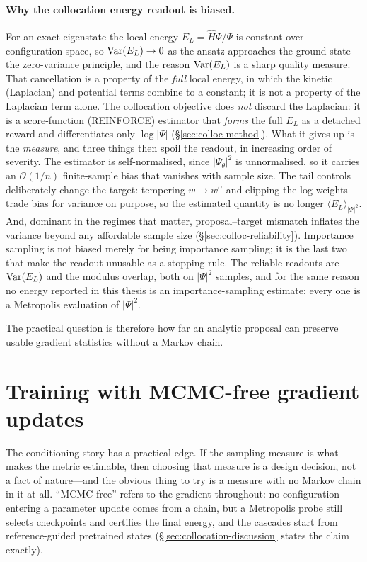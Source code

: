 \paragraph{Why the collocation energy readout is biased.} For an exact eigenstate the
local energy $E_L=\hat H\Psi/\Psi$ is constant over configuration space, so
$\mathrm{Var}(E_L)\to0$ as the ansatz approaches the ground state---the zero-variance principle,
and the reason $\mathrm{Var}(E_L)$ is a sharp quality measure. That cancellation is a property of
the \emph{full} local energy, in which the kinetic (Laplacian) and potential terms combine
to a constant; it is not a property of the Laplacian term alone. The collocation objective
does \emph{not} discard the Laplacian: it is a score-function (REINFORCE) estimator that
\emph{forms} the full $E_L$ as a detached reward and differentiates only $\log|\Psi|$
(\S\ref{sec:colloc-method}). What it gives up is the \emph{measure}, and three things then spoil the readout, in
increasing order of severity. The estimator is self-normalised, since $|\Psi_\theta|^2$ is
unnormalised, so it carries an $\mathcal O(1/n)$ finite-sample bias that vanishes with sample
size. The tail controls deliberately change the target: tempering $w\to w^\alpha$ and
clipping the log-weights trade bias for variance on purpose, so the estimated quantity is no
longer $\langle E_L\rangle_{|\Psi|^2}$. And, dominant in the regimes that matter,
proposal--target mismatch inflates the variance beyond any affordable sample size
(\S\ref{sec:colloc-reliability}). Importance sampling is not biased merely for being
importance sampling; it is the last two that make the readout unusable as a stopping rule.
The reliable readouts are $\mathrm{Var}(E_L)$ and the modulus overlap, both on $|\Psi|^2$ samples, and
for the same reason no energy reported in this thesis is an importance-sampling estimate:
every one is a Metropolis evaluation of $|\Psi|^2$.

The practical question is therefore how far an analytic proposal can preserve usable
gradient statistics without a Markov chain.

\section{Training with MCMC-free gradient updates}
\label{sec:kernel-mcmcfree}
\label{sec:collocation}

The conditioning story has a practical edge. If the sampling measure is what makes the
metric estimable, then choosing that measure is a design decision, not a fact of nature---and
the obvious thing to try is a measure with no Markov chain in it at all. ``MCMC-free''
refers to the gradient throughout: no configuration entering a parameter update comes from a
chain, but a Metropolis probe still selects checkpoints and certifies the final energy, and
the cascades start from reference-guided pretrained states
(\S\ref{sec:collocation-discussion} states the claim exactly).

